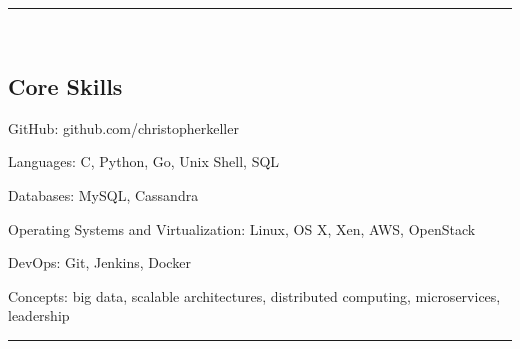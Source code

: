

\hrule\
\vspace{-0.4em}
\subsection*{Core Skills}
\begin{indentsection}{\parindent}
    \begin{description*}
        \item[GitHub:] github.com/christopherkeller
        \item[Languages:] C, Python, Go, Unix Shell, \textsc{SQL}
        \item[Databases:] My\textsc{SQL}, Cassandra
        \item[Operating Systems and Virtualization:] Linux, \textsc{OS X}, Xen, AWS, OpenStack
        \item[DevOps:] Git, Jenkins, Docker
        \item[Concepts:] big data, scalable architectures, distributed computing, microservices, leadership
	\end{description*}
\end{indentsection}
\hrule\
\vspace{-0.4em}
